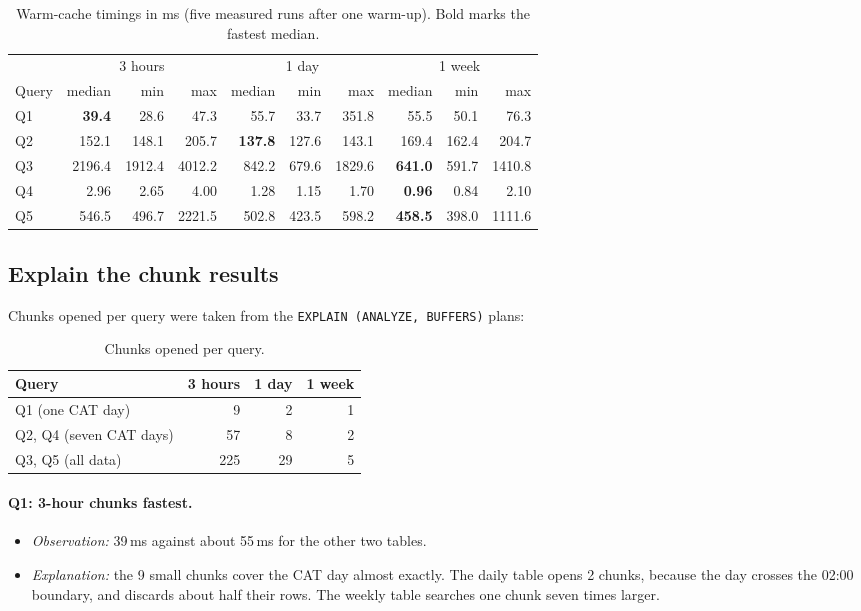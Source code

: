 \documentclass[11pt,a4paper]{article}
\begin{document}
\begin{table}[H]\centering\small
\begin{tabular}{l rrr rrr rrr}\toprule
 & \multicolumn{3}{c}{3 hours} & \multicolumn{3}{c}{1 day} & \multicolumn{3}{c}{1 week}\\
\cmidrule(lr){2-4}\cmidrule(lr){5-7}\cmidrule(lr){8-10}
Query & median & min & max & median & min & max & median & min & max\\\midrule
Q1 & \textbf{39.4} & 28.6 & 47.3 & 55.7 & 33.7 & 351.8 & 55.5 & 50.1 & 76.3\\
Q2 & 152.1 & 148.1 & 205.7 & \textbf{137.8} & 127.6 & 143.1 & 169.4 & 162.4 & 204.7\\
Q3 & 2196.4 & 1912.4 & 4012.2 & 842.2 & 679.6 & 1829.6 & \textbf{641.0} & 591.7 & 1410.8\\
Q4 & 2.96 & 2.65 & 4.00 & 1.28 & 1.15 & 1.70 & \textbf{0.96} & 0.84 & 2.10\\
Q5 & 546.5 & 496.7 & 2221.5 & 502.8 & 423.5 & 598.2 & \textbf{458.5} & 398.0 & 1111.6\\\bottomrule
\end{tabular}
\caption{Warm-cache timings in ms (five measured runs after one warm-up). Bold marks the
fastest median.}
\end{table}




\subsection{Explain the chunk results}
Chunks opened per query were taken from the \texttt{EXPLAIN (ANALYZE, BUFFERS)} plans:

\begin{table}[H]\centering\small
\begin{tabular}{lrrr}\toprule
Query & 3 hours & 1 day & 1 week\\\midrule
Q1 (one CAT day) & 9 & 2 & 1\\
Q2, Q4 (seven CAT days) & 57 & 8 & 2\\
Q3, Q5 (all data) & 225 & 29 & 5\\\bottomrule
\end{tabular}
\caption{Chunks opened per query.}
\end{table}

\paragraph{Q1: 3-hour chunks fastest.}
\begin{itemize}
\item \textit{Observation:} 39\,ms against about 55\,ms for the other two tables.
\item \textit{Explanation:} the 9 small chunks cover the CAT day almost exactly. The
daily table opens 2 chunks, because the day crosses the 02:00 boundary, and discards
about half their rows. The weekly table searches one chunk seven times larger.
\end{itemize}
\end{document}
